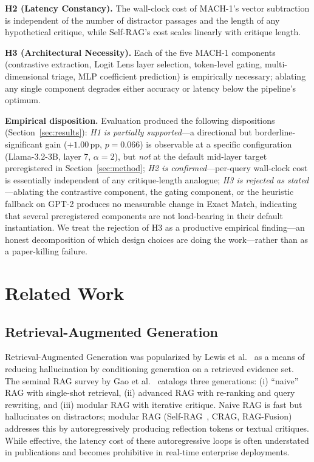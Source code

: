 \documentclass[conference]{IEEEtran}
\begin{document}
\smallskip
\noindent \textbf{H2 (Latency Constancy).} The wall-clock cost of MACH-1's vector subtraction is independent of the number of distractor passages and the length of any hypothetical critique, while Self-RAG's cost scales linearly with critique length.

\smallskip
\noindent \textbf{H3 (Architectural Necessity).} Each of the five MACH-1 components (contrastive extraction, Logit Lens layer selection, token-level gating, multi-dimensional triage, MLP coefficient prediction) is empirically necessary; ablating any single component degrades either accuracy or latency below the pipeline's optimum.

\smallskip
\textbf{Empirical disposition.} Evaluation produced the following dispositions (Section~\ref{sec:results}): \emph{H1 is partially supported}---a directional but borderline-significant gain ($+1.00$\,pp, $p\!=\!0.066$) is observable at a specific configuration (Llama-3.2-3B, layer 7, $\alpha\!=\!2$), but \emph{not} at the default mid-layer target preregistered in Section~\ref{sec:method}; \emph{H2 is confirmed}---per-query wall-clock cost is essentially independent of any critique-length analogue; \emph{H3 is rejected as stated}---ablating the contrastive component, the gating component, or the heuristic fallback on GPT-2 produces no measurable change in Exact Match, indicating that several preregistered components are not load-bearing in their default instantiation. We treat the rejection of H3 as a productive empirical finding---an honest decomposition of which design choices are doing the work---rather than as a paper-killing failure.

\section{Related Work}\label{sec:related}

\subsection{Retrieval-Augmented Generation}

Retrieval-Augmented Generation was popularized by Lewis et al.~\cite{lewis2020rag} as a means of reducing hallucination by conditioning generation on a retrieved evidence set. The seminal RAG survey by Gao et al.~\cite{gao2024rag} catalogs three generations: (i) ``naive'' RAG with single-shot retrieval, (ii) advanced RAG with re-ranking and query rewriting, and (iii) modular RAG with iterative critique. Naive RAG is fast but hallucinates on distractors; modular RAG (Self-RAG~\cite{asai2023selfrag}, CRAG, RAG-Fusion) addresses this by autoregressively producing reflection tokens or textual critiques. While effective, the latency cost of these autoregressive loops is often understated in publications and becomes prohibitive in real-time enterprise deployments.
\end{document}
